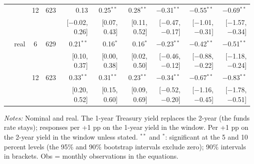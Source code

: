 \begin{longtable}{llcrrrrrrr}
 &  & 12 & 623 & 0.13 & 0.25$^{**}$ & 0.28$^{**}$ & $-$0.31$^{**}$ & $-$0.55$^{**}$ & $-$0.69$^{**}$\\
 & & & & {\scriptsize [$-$0.02, 0.26]} & {\scriptsize [0.07, 0.43]} & {\scriptsize [0.11, 0.52]} & {\scriptsize [$-$0.47, $-$0.17]} & {\scriptsize [$-$1.01, $-$0.31]} & {\scriptsize [$-$1.57, $-$0.34]}\\
 & real & 6 & 629 & 0.21$^{**}$ & 0.16$^{*}$ & 0.16$^{*}$ & $-$0.23$^{**}$ & $-$0.42$^{**}$ & $-$0.51$^{**}$\\
 & & & & {\scriptsize [0.10, 0.37]} & {\scriptsize [0.00, 0.38]} & {\scriptsize [0.02, 0.50]} & {\scriptsize [$-$0.46, $-$0.12]} & {\scriptsize [$-$0.88, $-$0.22]} & {\scriptsize [$-$1.18, $-$0.24]}\\
 &  & 12 & 623 & 0.33$^{**}$ & 0.31$^{**}$ & 0.23$^{**}$ & $-$0.34$^{**}$ & $-$0.67$^{**}$ & $-$0.83$^{**}$\\
 & & & & {\scriptsize [0.20, 0.52]} & {\scriptsize [0.15, 0.60]} & {\scriptsize [0.09, 0.69]} & {\scriptsize [$-$0.52, $-$0.20]} & {\scriptsize [$-$1.16, $-$0.45]} & {\scriptsize [$-$1.78, $-$0.51]}\\
\end{longtable}
\begin{flushleft}\footnotesize\textit{Notes:} Nominal and real. The 1-year Treasury yield replaces the 2-year (the funds rate stays); responses per +1 pp on the 1-year yield in the window. Per +1 pp on the 2-year yield in the window unless stated. $^{**}$ and $^{*}$: significant at the 5 and 10 percent levels (the 95\% and 90\% bootstrap intervals exclude zero); 90\% intervals in brackets. Obs = monthly observations in the equations.\end{flushleft}
\endgroup

